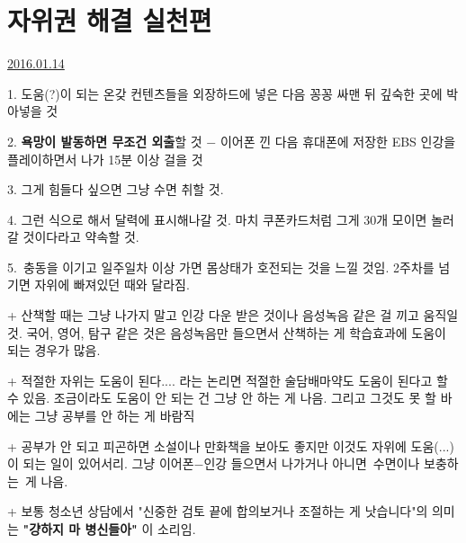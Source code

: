 \section{자위권 해결 실천편}
\href{https://www.kockoc.com/Apoc/587686}{2016.01.14}

\vspace{5mm}

\item 1. 도움(?)이 되는 온갖 컨텐츠들을 외장하드에 넣은 다음 꽁꽁 싸맨 뒤 깊숙한 곳에 박아넣을 것
\vspace{5mm}

\item 2. \textbf{욕망이 발동하면 무조건 외출}할 것 $-$ 이어폰 낀 다음 휴대폰에 저장한 EBS 인강을 플레이하면서 나가 15분 이상 걸을 것
\vspace{5mm}

\item 3. 그게 힘들다 싶으면 그냥 수면 취할 것.
\vspace{5mm}

\item 4. 그런 식으로 해서 달력에 표시해나갈 것. 마치 쿠폰카드처럼 그게 30개 모이면 놀러갈 것이다라고 약속할 것.
\vspace{5mm}

\item 5. 충동을 이기고 일주일차 이상 가면 몸상태가 호전되는 것을 느낄 것임. 2주차를 넘기면 자위에 빠져있던 때와 달라짐.
\vspace{5mm}

+ 산책할 때는 그냥 나가지 말고 인강 다운 받은 것이나 음성녹음 같은 걸 끼고 움직일 것.
국어, 영어, 탐구 같은 것은 음성녹음만 들으면서 산책하는 게 학습효과에 도움이 되는 경우가 많음.
\vspace{5mm}

+ 적절한 자위는 도움이 된다.... 라는 논리면 적절한 술담배마약도 도움이 된다고 할 수 있음.
조금이라도 도움이 안 되는 건 그냥 안 하는 게 나음. 그리고 그것도 못 할 바에는 그냥 공부를 안 하는 게 바람직
\vspace{5mm}

+ 공부가 안 되고 피곤하면 소설이나 만화책을 보아도 좋지만 이것도 자위에 도움(...)이 되는 일이 있어서리.
그냥 이어폰$-$인강 들으면서 나가거나 아니면 수면이나 보충하는 게 나음.
\vspace{5mm}

+ 보통 청소년 상담에서 "신중한 검토 끝에 합의보거나 조절하는 게 낫습니다"의 의미는 \textbf{"걍하지 마 병신들아"} 이 소리임.
\vspace{5mm}







